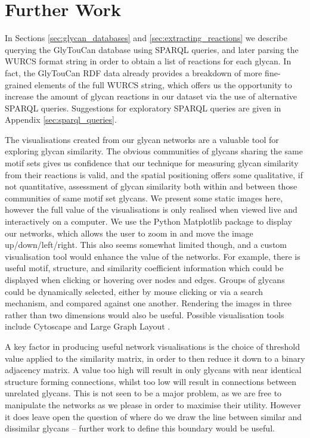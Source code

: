 \documentclass[12pt,a4paper]{article}
\begin{document}
\section{Further Work}
\label{sec:further_work}

In Sections \ref{sec:glycan_databases} and \ref{sec:extracting_reactions} we describe querying the GlyTouCan database using SPARQL queries, and later parsing the WURCS format string in order to obtain a list of reactions for each glycan. In fact, the GlyTouCan RDF data already provides a breakdown of more fine-grained elements of the full WURCS string, which offers us the opportunity to increase the amount of glycan reactions in our dataset via the use of alternative SPARQL queries. Suggestions for exploratory SPARQL queries are given in Appendix \ref{sec:sparql_queries}.

The visualisations created from our glycan networks are a valuable tool for exploring glycan similarity. The obvious communities of glycans sharing the same motif sets gives us confidence that our technique for measuring glycan similarity from their reactions is valid, and the spatial positioning offers some qualitative, if not quantitative, assessment of glycan similarity both within and between those communities of same motif set glycans. We present some static images here, however the full value of the visualisations is only realised when viewed live and interactively on a computer. We use the Python Matplotlib \citep{Hunter:2007} package to display our networks, which allows the user to zoom in and move the image up/down/left/right. This also seems somewhat limited though, and a custom visualisation tool would enhance the value of the networks. For example, there is useful motif, structure, and similarity coefficient information which could be displayed when clicking or hovering over nodes and edges. Groups of glycans could be dynamically selected, either by mouse clicking or via a search mechanism, and compared against one another. Rendering the images in three rather than two dimensions would also be useful. Possible visualisation tools include Cytoscape \citep{shannon2003cytoscape} and Large Graph Layout \citep{adai2004lgl}.

A key factor in producing useful network visualisations is the choice of threshold value applied to the similarity matrix, in order to then reduce it down to a binary adjacency matrix. A value too high will result in only glycans with near identical structure forming connections, whilst too low will result in connections between unrelated glycans. This is not seen to be a major problem, as we are free to manipulate the networks as we please in order to maximise their utility. However it does leave open the question of where do we draw the line between similar and dissimilar glycans -- further work to define this boundary would be useful.
\end{document}

